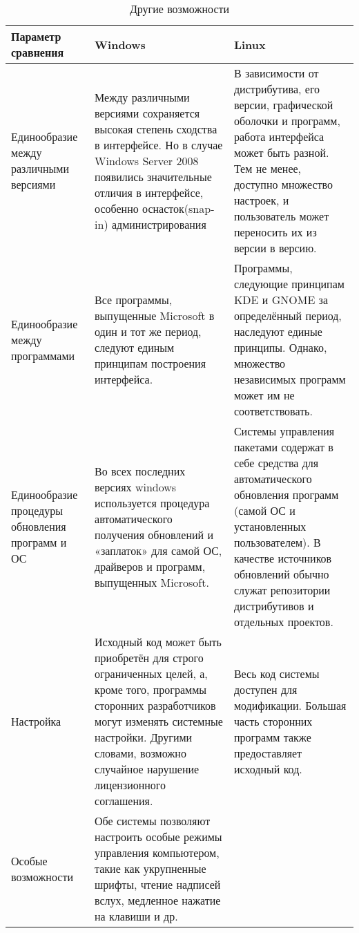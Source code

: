 \documentclass[14pt]{article}
\begin{document}
    \begin{table}[H]
        \caption{Другие возможности}
        \begin{tabularx}{\textwidth}{|X|X|X|}
            \hline
            Параметр сравнения & Windows & Linux \\
            \hline
            Единообразие между различными версиями & Между различными версиями сохраняется высокая степень сходства в интерфейсе. Но в случае Windows Server 2008 появились значительные отличия в интерфейсе, особенно оснасток(snap-in) администрирования & В зависимости от дистрибутива, его версии, графической оболочки и программ, работа интерфейса может быть разной. Тем не менее, доступно множество настроек, и пользователь может переносить их из версии в версию. \\
            \hline
            Единообразие между программами & Все программы, выпущенные Microsoft в один и тот же период, следуют единым принципам построения интерфейса. & Программы, следующие принципам KDE и GNOME за определённый период, наследуют единые принципы. Однако, множество независимых программ может им не соответствовать.  \\
            \hline
            Единообразие процедуры обновления программ и ОС & Во всех последних версиях windows используется процедура автоматического получения обновлений и «заплаток» для самой ОС, драйверов и программ, выпущенных Microsoft. & Системы управления пакетами содержат в себе средства для автоматического обновления программ (самой ОС и установленных пользователем). В качестве источников обновлений обычно служат репозитории дистрибутивов и отдельных проектов.  \\
            \hline
            Настройка & Исходный код может быть приобретён для строго ограниченных целей, а, кроме того, программы сторонних разработчиков могут изменять системные настройки. Другими словами, возможно случайное нарушение лицензионного соглашения. & Весь код системы доступен для модификации. Большая часть сторонних программ также предоставляет исходный код. \\
            \hline
            Особые возможности & Обе системы позволяют настроить особые режимы управления компьютером, такие как укрупненные шрифты, чтение надписей вслух, медленное нажатие на клавиши и др. & \\
            \hline
        \end{tabularx}
    \end{table}

    \newpage
\end{document}
